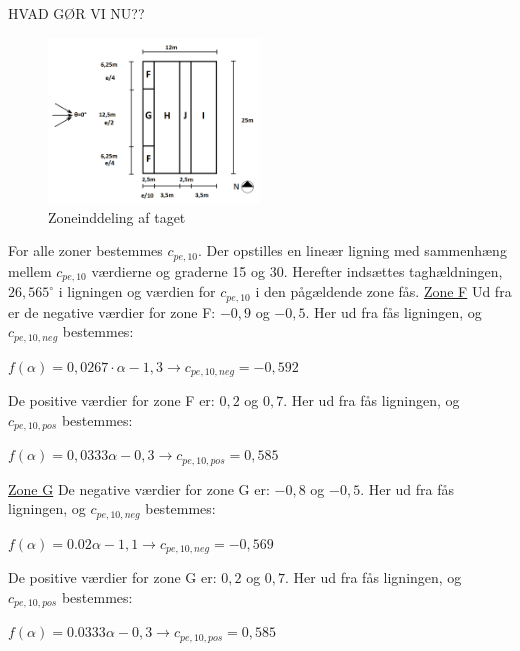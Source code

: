 HVAD GØR VI NU??

\begin{figure}[htbp]
	\centering
	\includegraphics[width=0.5\textwidth]{billeder/opdeling.png}
	\caption{Zoneinddeling af taget}
	\label{fig:tag}
\end{figure}

For alle zoner bestemmes $c_{pe,10}$. Der opstilles en lineær ligning med sammenhæng mellem $c_{pe,10}$ værdierne og graderne 15 og 30. Herefter indsættes taghældningen, $26,\!565^{\circ}$ i ligningen og værdien for $c_{pe,10}$ i den pågældende zone fås.
\newline
\newline
\underline{Zone F}
\newline
Ud fra \citep[ tabel 7.4a kapitel 7.2.5]{EU91} er de negative værdier for zone F: $-0,\!9$ og $-0,\!5$. Her ud fra fås ligningen, og $c_{pe,10,neg}$ bestemmes:
\begin{center}
	$f(\alpha)=0,\!0267\cdot \alpha - 1,\!3 \to c_{pe,10,neg}=-0,\!592$
\end{center}
De positive værdier for zone F er: $0,\!2$ og $0,\!7$. Her ud fra fås ligningen, og $c_{pe,10,pos}$ bestemmes:
\begin{center}
	$f(\alpha)=0,\!0333\alpha - 0,\!3 \to c_{pe,10,pos}=0,\!585$
\end{center}

\underline{Zone G}
\newline
De negative værdier for zone G er: $-0,\!8$ og $-0,\!5$. Her ud fra fås ligningen, og $c_{pe,10,neg}$ bestemmes:
\begin{center}
	$f(\alpha)=0.02\alpha - 1,\!1 \to c_{pe,10,neg}=-0,\!569$
\end{center}
De positive værdier for zone G er: $0,\!2$ og $0,\!7$. Her ud fra fås ligningen, og $c_{pe,10,pos}$ bestemmes:
\begin{center}
	$f(\alpha)=0.0333\alpha - 0,\!3 \to c_{pe,10,pos}=0,\!585$
\end{center}

